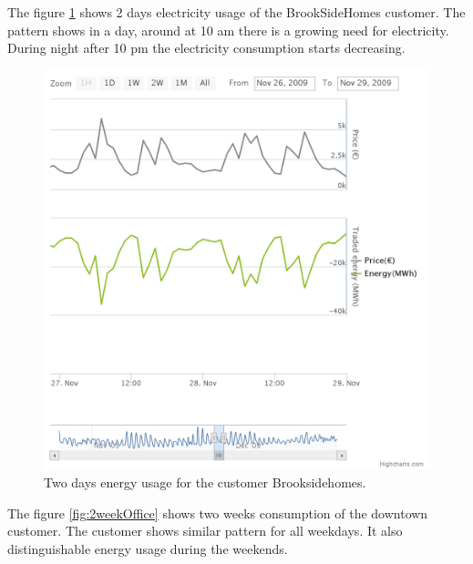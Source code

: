 The figure  \ref{fig:2daysbrook} shows 2 days electricity usage of the BrookSideHomes customer. The pattern shows in a day, around at 10 am there is a growing need for electricity. During night after 10 pm the electricity consumption starts decreasing.
\begin{figure}[h!]
  \includegraphics[width=\linewidth]{BrooksideHomes-2days.png}
  \caption{Two days energy usage for the customer Brooksidehomes.}
  \label{fig:2daysbrook}
\end{figure}

The figure \ref{fig:2weekOffice} shows two weeks consumption of the downtown customer. The customer shows similar pattern for all weekdays. It also distinguishable energy usage during the weekends.

